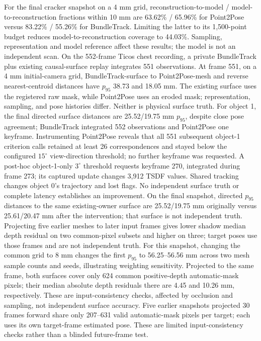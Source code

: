 \documentclass[10pt,journal]{IEEEtran}
\begin{document}
For the final cracker snapshot on a 4 mm grid, reconstruction-to-model / model-to-reconstruction fractions within 10 mm are 63.62\% / 65.96\% for Point2Pose versus 83.22\% / 55.26\% for BundleTrack. Limiting the latter to its 1,500-point budget reduces model-to-reconstruction coverage to 44.03\%. Sampling, representation and model reference affect these results; the model is not an independent scan. On the 552-frame Ticos chest recording, a private BundleTrack plus existing causal-surface replay integrates 551 observations. At frame 551, on a 4 mm initial-camera grid, BundleTrack-surface to Point2Pose-mesh and reverse nearest-centroid distances have $p_{95}$ 38.73 and 18.05 mm. The existing surface uses the registered raw mask, while Point2Pose uses an eroded mask; representation, sampling, and pose histories differ. Neither is physical surface truth. For object 1, the final directed surface distances are 25.52/19.75 mm $p_{95}$, despite close pose agreement; BundleTrack integrated 552 observations and Point2Pose one keyframe. Instrumenting Point2Pose reveals that all 551 subsequent object-1 criterion calls retained at least 26 correspondences and stayed below the configured $15^\circ$ view-direction threshold; no further keyframe was requested. A post-hoc object-1-only $3^\circ$ threshold requests keyframe 270, integrated during frame 273; its captured update changes 3,912 TSDF values. Shared tracking changes object 0's trajectory and lost flags. No independent surface truth or complete latency establishes an improvement. On the final snapshot, directed $p_{95}$ distances to the same existing-owner surface are 25.52/19.75 mm originally versus 25.61/20.47 mm after the intervention; that surface is not independent truth. Projecting five earlier meshes to later input frames gives lower shadow median depth residual on two common-pixel subsets and higher on three; target poses use those frames and are not independent truth. For this snapshot, changing the common grid to 8 mm changes the first $p_{95}$ to 56.25--56.56 mm across two mesh sample counts and seeds, illustrating weighting sensitivity. Projected to the same frame, both surfaces cover only 624 common positive-depth automatic-mask pixels; their median absolute depth residuals there are 4.45 and 10.26 mm, respectively. These are input-consistency checks, affected by occlusion and sampling, not independent surface accuracy. Five earlier snapshots projected 30 frames forward share only 207--631 valid automatic-mask pixels per target; each uses its own target-frame estimated pose. These are limited input-consistency checks rather than a blinded future-frame test.
\end{document}
